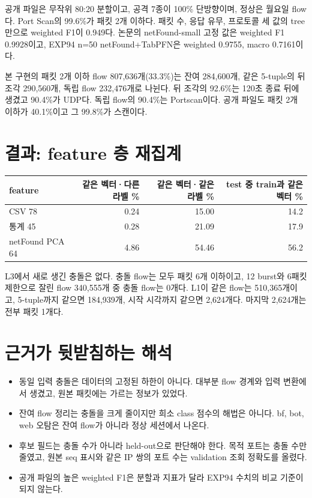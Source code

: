 공개 파일은 무작위 80:20 분할이고, 공격 7종이 100\% 단방향이며, 정상은 월요일 flow다. Port Scan의 99.6\%가 패킷 2개 이하다. 패킷 수, 응답 유무, 프로토콜 세 값의 tree만으로 weighted F1이 0.949다. 논문의 netFound-small 고정 값은 weighted F1 0.9928이고, EXP94 n=50 netFound+TabPFN은 weighted 0.9755, macro 0.7161이다.

본 구현의 패킷 2개 이하 flow 807,636개(33.3\%)는 잔여 284,600개, 같은 5-tuple의 뒤 조각 290,560개, 독립 flow 232,476개로 나뉜다. 뒤 조각의 92.6\%는 120초 종료 뒤에 생겼고 90.4\%가 UDP다. 독립 flow의 90.4\%는 Portscan이다. 공개 파일도 패킷 2개 이하가 40.1\%이고 그 99.8\%가 스캔이다.

\section{결과: feature 층 재집계}
\begin{center}\small
\begin{tabular}{lrrr}
\toprule
feature & 같은 벡터·다른 라벨 \% & 같은 벡터·같은 라벨 \% & test 중 train과 같은 벡터 \%\\\midrule
CSV 78 & 0.24 & 15.00 & 14.2\\
통계 45 & 0.28 & 21.09 & 17.9\\
netFound PCA 64 & 4.86 & 54.46 & 56.2\\
\bottomrule
\end{tabular}
\end{center}
L3에서 새로 생긴 충돌은 없다. 충돌 flow는 모두 패킷 6개 이하이고, 12 burst와 6패킷 제한으로 잘린 flow 340,555개 중 충돌 flow는 0개다. L1이 같은 flow는 510,365개이고, 5-tuple까지 같으면 184,939개, 시작 시각까지 같으면 2,624개다. 마지막 2,624개는 전부 패킷 1개다.

\section{근거가 뒷받침하는 해석}
\begin{itemize}
\item 동일 입력 충돌은 데이터의 고정된 하한이 아니다. 대부분 flow 경계와 입력 변환에서 생겼고, 원본 패킷에는 가르는 정보가 있었다.
\item 잔여 flow 정리는 충돌을 크게 줄이지만 희소 class 점수의 해법은 아니다. bf, bot, web 오탐은 잔여 flow가 아니라 정상 세션에서 나온다.
\item 후보 필드는 충돌 수가 아니라 held-out으로 판단해야 한다. 목적 포트는 충돌 수만 줄였고, 원본 seq 표시와 같은 IP 쌍의 포트 수는 validation 조회 정확도를 올렸다.
\item 공개 파일의 높은 weighted F1은 분할과 지표가 달라 EXP94 수치의 비교 기준이 되지 않는다.
\end{itemize}

